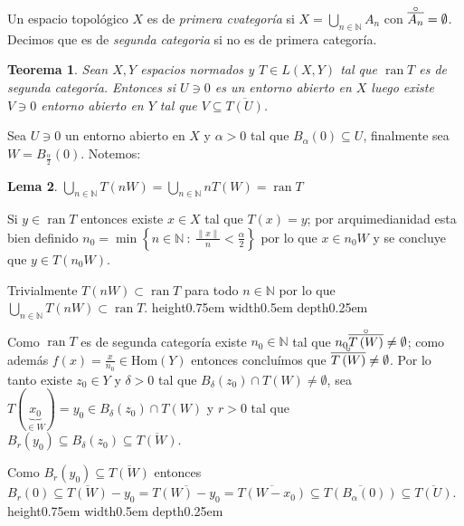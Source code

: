 \documentclass[11pt]{article}
\newcommand{\N}{{\mathbb{N}}}
\newcommand\tq{~:~}
\newcommand{\norm}[1]{\left\lVert#1\right\rVert}
\newcommand{\sett}[1]{\left\lbrace#1\right\rbrace}
\newcommand{\interior}[1]{\accentset{\smash{\raisebox{-0.12ex}{$\scriptstyle\circ$}}}{#1}\rule{0pt}{2.3ex}}
\newcommand{\Bigcup}[2]{\bigcup\limits_{#1}{#2}}
\DeclareMathOperator{\rank}{ran}
\newtheorem{theorem}{Teorema}
\numberwithin{theorem}{subsection}
\newtheorem{lemma}[theorem]{Lema}
\newenvironment{proof}[1][Demostraci\'on]{\begin{trivlist}
		\item[\hskip \labelsep {\bfseries #1}]}{\end{trivlist}}
\newenvironment{definition}[1][Definici\'on]{\begin{trivlist}
		\item[\hskip \labelsep {\bfseries #1}]}{\end{trivlist}}
\newcommand{\qed}{\nobreak \ifvmode \relax \else
	\ifdim\lastskip<1.5em \hskip-\lastskip
	\hskip1.5em plus0em minus0.5em \fi \nobreak
	\vrule height0.75em width0.5em depth0.25em\fi}
\begin{document}
\begin{definition}
	Un espacio topol\'ogico  $X$ es de \textit{primera cvategor\'ia} si $X = \Bigcup{n \in \N}{A_n}$ con $\interior{\overline{A_n}} = \emptyset$. Decimos que es de \textit{segunda categoria} si no es de primera categor\'ia.
\end{definition}

\begin{theorem}
	\label{Lemma: Teorema aplicacion abierta}
	Sean $X,Y$ espacios normados y $T \in L(X,Y)$ tal que $\rank T $ es de segunda categor\'ia. Entonces si $U \ni 0$ es un entorno abierto en $X$ luego existe $V \ni 0$ entorno abierto en $Y$ tal que $V \subseteq \overline{T(U)}$.
\end{theorem}

\begin{proof}
	Sea $U \ni 0$ un entorno abierto en $X$ y $\alpha > 0$ tal que $B_{\alpha}(0) \subseteq U$, finalmente sea $W = B_{\frac{\alpha}{2}}(0)$. Notemos:
	
	\begin{lemma}
		$\Bigcup{n \in \N}{T\left(nW\right)} = \Bigcup{n \in \N}{nT\left(W\right)} = \rank T$
	\end{lemma}
	
	\begin{proof}[Demostraci\'on del lema]
		
		Si $y \in \rank T$ entonces existe $x \in X$ tal que $T(x) = y$; por arquimedianidad esta bien definido $n_0 = \min \sett{n \in \N \tq \frac{\norm{x}}{n} < \frac{\alpha}{2}}$ por lo que $x \in n_0W$ y se concluye que $y \in T\left(n_0 W\right)$.
		
		Trivialmente $T \left(nW \right) \subset \rank T$ para todo $n \in \N$ por lo que $\Bigcup{n \in \N}{T\left(nW\right)} \subset \rank T$. \qed
		
	\end{proof}
	
	Como $\rank T$ es de segunda categor\'ia existe $n_0 \in \N$ tal que $n_0\interior{\overline{T \left(W\right)}} \neq \emptyset$; como adem\'as $f(x) = \frac{x}{n_0} \in \text{Hom}(Y)$ entonces conclu\'imos que $\interior{\overline{T \left(W\right)}} \neq \emptyset$. Por lo tanto existe $z_0 \in Y$ y $\delta > 0$ tal que $B_{\delta}(z_0) \cap T \left(W\right) \neq \emptyset$, sea $T(\underbrace{x_0}_{\in W}) = y_0 \in B_{\delta}(z_0) \cap T \left(W\right)$ y $r > 0$ tal que $B_{r}(y_0) \subseteq B_{\delta}(z_0) \subseteq \overline{T \left(W\right)}$.
	
	Como $B_{r}(y_0) \subseteq \overline{T(W)}$ entonces $B_{r}(0) \subseteq \overline{T\left(W\right)} - y_0 = \overline{T \left(W\right) - y_0} = \overline{T \left(W- x_0\right) } \subseteq \overline{T \left(B_{\alpha}(0)\right)} \subseteq \overline{T \left(U\right)}$. \qed 
	
\end{proof}
\end{document}
